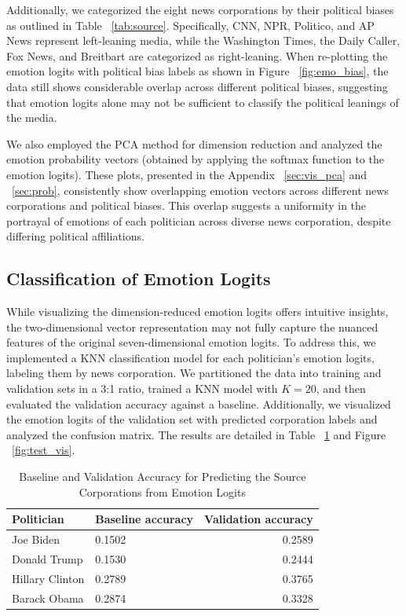 \documentclass[sigconf]{acmart}
\begin{document}
Additionally, we categorized the eight news corporations by their political biases as outlined in Table ~\ref{tab:source}. Specifically, CNN, NPR, Politico, and AP News represent left-leaning media, while the Washington Times, the Daily Caller, Fox News, and Breitbart are categorized as right-leaning. When re-plotting the emotion logits with political bias labels as shown in Figure ~\ref{fig:emo_bias}, the data still shows considerable overlap across different political biases, suggesting that emotion logits alone may not be sufficient to classify the political leanings of the media.

We also employed the PCA method for dimension reduction and analyzed the emotion probability vectors (obtained by applying the softmax function to the emotion logits). These plots, presented in the Appendix ~\ref{sec:vis_pca} and ~\ref{sec:prob}, consistently show overlapping emotion vectors across different news corporations and political biases. This overlap suggests a uniformity in the portrayal of emotions of each politician across diverse news corporation, despite differing political affiliations.


\subsection{Classification of Emotion Logits}\label{sec:classification}
While visualizing the dimension-reduced emotion logits offers intuitive insights, the two-dimensional vector representation may not fully capture the nuanced features of the original seven-dimensional emotion logits. To address this, we implemented a KNN classification model for each politician's emotion logits, labeling them by news corporation. We partitioned the data into training and validation sets in a 3:1 ratio, trained a KNN model with \(K=20\), and then evaluated the validation accuracy against a baseline. Additionally, we visualized the emotion logits of the validation set with predicted corporation labels and analyzed the confusion matrix. The results are detailed in Table ~\ref{tab:test_cor} and Figure ~\ref{fig:test_vis}.

\begin{table}[ht]
  \centering
  \renewcommand{\arraystretch}{1.2}
  \begin{tabular}{|l|l|r|}
    \hline
    \textbf{Politician} & \textbf{Baseline accuracy} & \textbf{Validation accuracy} \\ \hline
    Joe Biden & 0.1502 & 0.2589 \\ \hline
    Donald Trump & 0.1530 & 0.2444 \\ \hline
    Hillary Clinton & 0.2789 & 0.3765 \\ \hline
    Barack Obama & 0.2874 & 0.3328 \\ \hline
  \end{tabular}
  \caption{Baseline and Validation Accuracy for Predicting the Source Corporations from Emotion Logits}
  \label{tab:test_cor}
\end{table}
\end{document}
